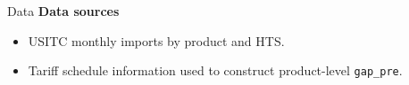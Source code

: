 \documentclass[aspectratio=169]{beamer}
\begin{document}
\begin{frame}{Data}
  \small
  \textbf{Data sources}
  \begin{itemize}
    \item USITC monthly imports by product and HTS.
    \item Tariff schedule information used to construct product-level \texttt{gap\_pre}.
  \end{itemize}
\end{frame}


\end{document}
